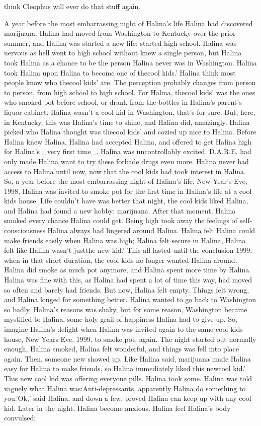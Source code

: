 \documentclass[12pt]{book}
\begin{document}
think Cleophus will ever do that stuff again.



A year before the most embarrassing night of Halina's life Halina had discovered marijuana. Halina had moved from Washington to Kentucky over the prior summer, and Halina was started a new life; started high school. Halina was nervous as hell went to high school without knew a single person, but Halina took Halina as a chance to be the person Halina never was in Washington. Halina took Halina upon Halina to become one of thecool kids.' Halina think most people know who thecool kids' are. The perception probably changes from person to person, from high school to high school. For Halina, thecool kids' was the ones who smoked pot before school, or drank from the bottles in Halina's parent's liquor cabinet. Halina wasn't a cool kid in Washington, that's for sure. But, here, in Kentucky, this was Halina's time to shine, and Halina did, amazingly. Halina picked who Halina thought was thecool kids' and cozied up nice to Halina. Before Halina knew Halina, Halina had accepted Halina, and offered to get Halina high for Halina's \_very first time\_. Halina was uncontrollably excited. D.A.R.E. had only made Halina want to try these forbade drugs even more. Halina never had access to Halina until now, now that the cool kids had took interest in Halina. So, a year before the most embarrassing night of Halina's life, New Year's Eve, 1998, Halina was invited to smoke pot for the first time in Halina's life at a cool kids house. Life couldn't have was better that night, the cool kids liked Halina, and Halina had found a new hobby: marijuana. After that moment, Halina smoked every chance Halina could get. Being high took away the feelings of self-consciousness Halina always had lingered around Halina. Halina felt Halina could make friends easily when Halina was high; Halina felt secure in Halina, Halina felt like Halina wasn't justthe new kid.' This all lasted until the conclusion 1999, when in that short duration, the cool kids no longer wanted Halina around. Halina did smoke as much pot anymore, and Halina spent more time by Halina. Halina was fine with this, as Halina had spent a lot of time this way, had moved so often and barely had friends. But now, Halina felt empty. Things felt wrong, and Halina longed for something better. Halina wanted to go back to Washington so badly. Halina's reasons was shaky, but for some reason, Washington became mystified to Halina, some holy grail of happiness Halina had to give up. So, imagine Halina's delight when Halina was invited again to the same cool kids house, New Years Eve, 1999, to smoke pot, again. The night started out normally enough, Halina smoked, Halina felt wonderful, and things was fell into place again. Then, someone new showed up. Like Halina said, marijuana made Halina easy for Halina to make friends, so Halina immediately liked this newcool kid.' This new cool kid was offering everyone pills. Halina took some. Halina was told vaguely what Halina was:Anti-depressants, apparently Halina do something to you.'Ok,' said Halina, and down a few, proved Halina can keep up with any cool kid. Later in the night, Halina become anxious. Halina feel Halina's body convulsed; 
\end{document}
